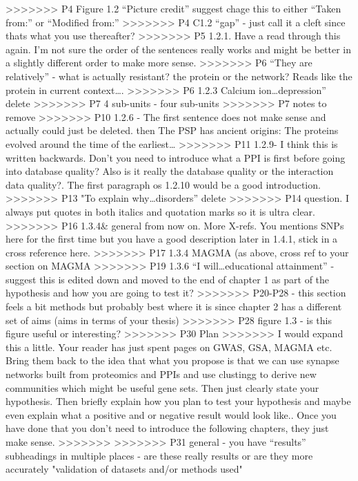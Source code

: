 >>>>>>> P4 Figure 1.2 “Picture credit” suggest chage this to either “Taken from:” or “Modified from:”
>>>>>>> P4 C1.2 “gap” - just call it a cleft since thats what you use thereafter?
>>>>>>> P5 1.2.1. Have a read through this again. I’m not sure the order of the sentences really works and might be better in a slightly different order to make more sense.
>>>>>>> P6 “They are relatively” - what is actually resistant? the protein or the network? Reads like the protein in current context….
>>>>>>> P6 1.2.3 Calcium ion…depression” delete
>>>>>>> P7 4 sub-units - four sub-units
>>>>>>> P7 notes to remove
>>>>>>> P10 1.2.6 - The first sentence does not make sense and actually could just be deleted. then The PSP has ancient origins: The proteins evolved around the time of the earliest…
>>>>>>> P11 1.2.9- I think this is written backwards. Don’t you need to introduce what a PPI is first before going into database quality? Also is it really the database quality or the interaction data quality?. The first paragraph os 1.2.10 would be a good introduction.
>>>>>>> P13 "To explain why…disorders” delete
>>>>>>> P14 question. I always put quotes in both italics and quotation marks so it is ultra clear.
>>>>>>> P16 1.3.4& general from now on. More X-refs. You mentions SNPs here for the first time but you have a good description later  in 1.4.1, stick in a cross reference here.
>>>>>>> P17 1.3.4 MAGMA (as above, cross ref to your section on MAGMA
>>>>>>> P19 1.3.6 “I will…educational attainment” - suggest this is edited down and moved to the end of chapter 1 as part of the hypothesis and how you are going to test it?
>>>>>>> P20-P28 - this section feels a bit methods but probably best where it is since chapter 2 has a different set of aims (aims in terms of your thesis)
>>>>>>> P28 figure 1.3 - is this figure useful or interesting?
>>>>>>> P30 Plan
>>>>>>> I would expand this a little. Your reader has just spent pages on GWAS, GSA, MAGMA etc. Bring them back to the idea that what you propose is that we can use synapse networks built from proteomics and PPIs and use clustingg to derive new communities which might be useful gene sets. Then just clearly state your hypothesis. Then briefly explain how you plan to test your hypothesis and maybe even explain what a positive and or negative result would look like.. Once you have done that you don’t need to introduce the following chapters, they just make sense.
>>>>>>>
>>>>>>> P31 general - you have “results” subheadings in multiple places - are these really results or are they more accurately  "validation of datasets and/or methods used"
